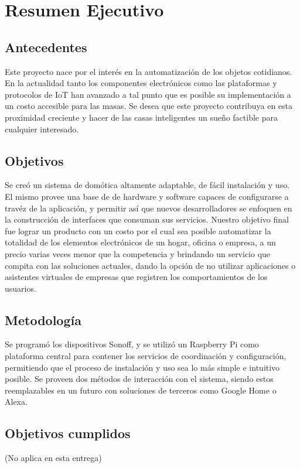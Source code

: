 \chapter{Resumen Ejecutivo}

\section{Antecedentes}

Este proyecto nace por el interés en la automatización de los objetos cotidianos. En la actualidad tanto los componentes electrónicos como las plataformas y protocolos de IoT han avanzado a tal punto que es posible su implementación a un costo accesible para las masas. Se desea que este proyecto contribuya en esta proximidad creciente y hacer de las casas inteligentes un sueño factible para cualquier interesado.

\section{Objetivos}

Se creó un sistema de domótica altamente adaptable, de fácil instalación y uso. El mismo provee una base de de hardware y software capaces de configurarse a travéz de la aplicación, y permitir así que nuevos desarrolladores se enfoquen en la construcción de interfaces que consuman sus servicios. Nuestro objetivo final fue lograr un producto con un costo por el cual sea posible automatizar la totalidad de los elementos electrónicos de un hogar, oficina o empresa, a un precio varias veces menor que la competencia y brindando un servicio que compita con las soluciones actuales, dando la opción de no utilizar aplicaciones o asistentes virtuales de empresas que registren los comportamientos de los usuarios.

\section{Metodología}

Se programó los dispositivos Sonoff, y se utilizó un Raspberry Pi como plataforma central para contener los servicios de coordinación y configuración, permitiendo que el proceso de instalación y uso sea lo más simple e intuitivo posible. Se proveen dos métodos de interacción con el sistema, siendo estos reemplazables en un futuro con soluciones de terceros como Google Home o Alexa. 

\section{Objetivos cumplidos}

(No aplica en esta entrega)